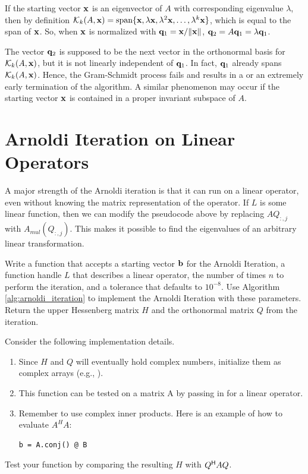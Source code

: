 \begin{warn}
If the starting vector $\mathbf{x}$ is an eigenvector of $A$ with corresponding eigenvalue $\lambda$, then by definition $\mathcal{K}_k(A, \mathbf{x})=\text{span}\{\mathbf{x}, \lambda \mathbf{x}, \lambda^2\mathbf{x}, \ldots, \lambda^k \mathbf{x}\}$, which is equal to the span of $\mathbf{x}$.
So, when $\mathbf{x}$ is normalized with $\mathbf{q}_1 = \mathbf{x}/\|\mathbf{x}\|$, $\mathbf{q}_2 = A\mathbf{q}_1 = \lambda \mathbf{q}_1$.

The vector $\mathbf{q}_2$ is supposed to be the next vector in the orthonormal basis for $\mathcal{K}_k(A, \mathbf{x})$, but it is not linearly independent of $\mathbf{q}_1$.
In fact, $\mathbf{q}_1$ already spans $\mathcal{K}_k(A, \mathbf{x})$.
Hence, the Gram-Schmidt process fails and results in a  or an extremely early termination of the algorithm.
A similar phenomenon may occur if the starting vector $\mathbf{x}$ is contained in a proper invariant subspace of $A$.
\end{warn}

\section*{Arnoldi Iteration on Linear Operators} %

A major strength of the Arnoldi iteration is that it can run on a linear operator, even without knowing the matrix representation of the operator.
If $L$ is some linear function, then we can modify the pseudocode above by replacing $AQ_{:,j}$ with $A_{mul}(Q_{:,j})$.
This makes it possible to find the eigenvalues of an arbitrary linear transformation.

\begin{problem}\label{prob:arnoldi}
Write a function that accepts a starting vector $\mathbf{b}$ for the Arnoldi Iteration, a function handle $L$ that describes a linear operator, the number of times $n$ to perform the iteration, and a tolerance  that defaults to $10^{-8}$.
Use Algorithm \ref{alg:arnoldi_iteration} to implement the Arnoldi Iteration with these parameters.
Return the upper Hessenberg matrix $H$ and the orthonormal matrix $Q$ from the iteration.

Consider the following implementation details.
\begin{enumerate}
\item Since $H$ and $Q$ will eventually hold complex numbers, initialize them as complex arrays (e.g., ).
\item This function can be tested on a matrix A by passing in  for a linear operator.
\item Remember to use complex inner products. Here is an example of how to evaluate $A^HA$:
\begin{lstlisting}
b = A.conj() @ B
\end{lstlisting}
\end{enumerate}
Test your function by comparing the resulting $H$ with $Q^{\mathsf H} A Q$.
\end{problem}

